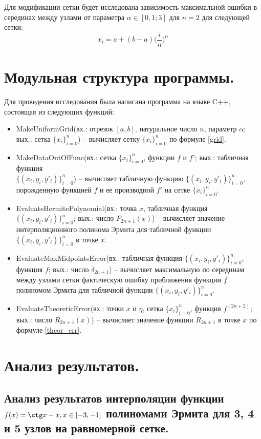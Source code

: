 \documentclass[a4paper, 12pt]{article}
\begin{document}
	Для модификации сетки будет исследована зависимость максимальной ошибки в серединах между узлами от параметра $\alpha\in[0,1;3]$ для $n=2$ для следующей сетки:
    \begin{equation} \label{grid}
    	x_i=a+(b-a)\bigg(\frac{i}{n}\bigg)^\alpha
    \end{equation}
	
	\section{Модульная структура программы.}
	Для проведения исследования была написана программа на языке C++, состоящая из следующих функций:
	\begin{itemize}
		\item MakeUniformGrid(вх.: отрезок $[a,b]$, натуральное число $n$, параметр $\alpha$; вых.: сетка $\{x_i\}_{i=0}^n$) -- вычисляет сетку $\{x_i\}_{i=0}^n$ по формуле \eqref{grid}.
		\item MakeDataOutOfFunc(вх.: сетка $\{x_i\}_{i=0}^n$, функции $f$ и $f'$; вых.: табличная функция \\ $\{(x_i,y_i,y'_i)\}_{i=0}^n$) -- вычисляет табличную функцию $\{(x_i,y_i,y'_i)\}_{i=0}^n$, порожденную функцией $f$ и ее производной $f'$ на сетке $\{x_i\}_{i=0}^n$.
		\item EvaluateHermitePolynomial(вх.: точка $x$, табличная функция $\{(x_i,y_i,y'_i)\}_{i=0}^n$; вых.: число $P_{2n+1}(x)$) -- вычисляет значение интерполяционного полинома Эрмита для табличной функции $\{(x_i,y_i,y'_i)\}_{i=0}^n$ в точке $x$.
		\item EvaluateMaxMidpointsError(вх.: табличная функция $\{(x_i,y_i,y'_i)\}_{i=0}^n$, функция $f$; вых.: число $\delta_{2n+1}$) -- вычисляет максимальную по серединам между узлами сетки фактическую ошибку приближения функции $f$ полиномом Эрмита для табличной функции $\{(x_i,y_i,y'_i)\}_{i=0}^n$.
		\item EvaluateTheoreticError(вх.: точки $x$ и $\eta$, сетка $\{x_i\}_{i=0}^n$, функция $f^{(2n+2)}$; вых.: число $R_{2n+1}(x)$) -- вычисляет значение функции $R_{2n+1}$ в точке $x$ по формуле \eqref{theor_err}.
	\end{itemize}
	
	\section{Анализ результатов.}
	
	\subsection{Анализ результатов интерполяции функции $f(x)=\ctg x-x, x\in[-3,-1]$ полиномами Эрмита для 3, 4 и 5 узлов на равномерной сетке.} 
	
\end{document}

